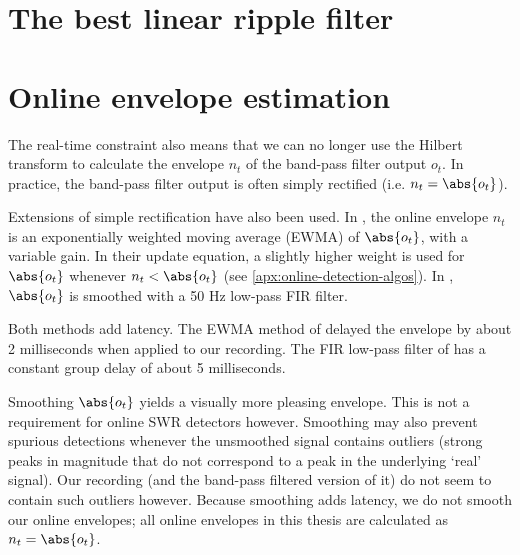 \section{The best linear ripple filter}


\clearpage
\begin{figure}
\end{figure}

\begin{figure}
\end{figure}


\section{Online envelope estimation}

The real-time constraint also means that we can no longer use the Hilbert transform to calculate the envelope $n_t$ of the band-pass filter output $o_t$. In practice, the band-pass filter output is often simply rectified (i.e. $n_t = \abs{o_t}$).

Extensions of simple rectification have also been used. In , the online envelope $n_t$ is an exponentially weighted moving average (EWMA) of $\abs{o_t}$, with a variable gain. In their update equation, a slightly higher weight is used for $\abs{o_t}$  whenever $n_t < \abs{o_t}$ (see \cref{apx:online-detection-algos}). In , $\abs{o_t}$ is smoothed with a 50 Hz low-pass FIR filter.

Both methods add latency. The EWMA method of \citeauthor*{Jadhav2012} delayed the envelope by about 2 milliseconds when applied to our recording. The FIR low-pass filter of \citeauthor*{Dutta2018} has a constant group delay of about 5 milliseconds.

Smoothing $\abs{o_t}$ yields a visually more pleasing envelope. This is not a requirement for online SWR detectors however. Smoothing may also prevent spurious detections whenever the unsmoothed signal contains outliers (strong peaks in magnitude that do not correspond to a peak in the underlying `real' signal). Our recording (and the band-pass filtered version of it) do not seem to contain such outliers however. Because smoothing adds latency, we do not smooth our online envelopes; all online envelopes in this thesis are calculated as $n_t = \abs{o_t}$.
